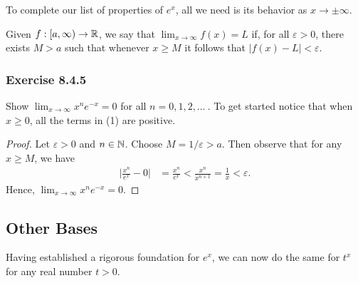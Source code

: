 To complete our list of properties of \( e^{x}  \), all we need is its behavior as \( x \to \pm \infty  \).

\begin{definition}
    Given \( f : [a,\infty )  \to \mathbb{R} \), we say that \( \lim_{ x \to \infty  }  f(x) = L  \) if, for all \( \varepsilon > 0  \), there exists \( M > a  \) such that whenever \( x \geq M  \) it follows that \( |  f(x) - L  | < \varepsilon  \).
\end{definition}

\subsubsection{Exercise 8.4.5} Show \( \lim_{ x \to \infty  }  x^{n} e^{-x} = 0  \) for all \( n = 0,1,2, \dots \ \). To get started notice that when \( x \geq 0   \), all the terms in (1) are positive.
\begin{proof}
    Let \( \varepsilon > 0  \) and \( n \in \mathbb{N}  \). Choose \( M = 1 / \varepsilon  > a   \). Then observe that for any \( x \geq M  \), we have
    \begin{align*}
        \Big| \frac{ x^{n} }{  e^{x} }  - 0  \Big| &= \frac{ x^{n}  }{  e^{x} }  
                                                   <  \frac{ x^{n}  }{  x^{n+1} } 
                                                   = \frac{ 1 }{ x } 
                                                   < \varepsilon.
    \end{align*}
    Hence, \( \lim_{ x \to \infty  }  x^{n} e^{-x} = 0. \)
\end{proof}

\subsection{Other Bases}

Having established a rigorous foundation for \( e^{x}  \), we can now do the same for \( t^{x}  \) for any real number \( t > 0   \). 

